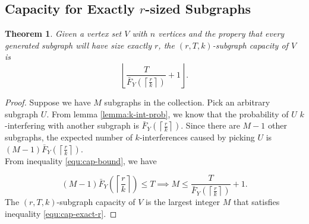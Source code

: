 \documentclass[10pt]{extarticle}
\newtheorem{theorem}{Theorem}
\theoremstyle{definition}
\begin{document}
\subsection{Capacity for Exactly $r$-sized Subgraphs}

\begin{theorem}
    Given a vertex set $V$ with $n$ vertices and the propery that every generated subgraph will have size exactly $r$, the $(r,T,k)$-subgraph capacity of $V$ is 
    \begin{equation*}
        \left\lfloor \frac{T}{\bar{F}_Y\left(\left\lceil \frac{r}{k} \right\rceil\right)} + 1 \right\rfloor.
    \end{equation*}
\end{theorem}

\begin{proof}
    Suppose we have $M$ subgraphs in the collection. Pick an arbitrary subgraph $U$. From lemma \ref{lemma:k-int-prob}, we know that the probability of $U$ $k$-interfering with another subgraph is $\bar{F}_Y\left(\left\lceil \frac{r}{k} \right\rceil\right)$. Since there are $M-1$ other subgraphs, the expected number of $k$-interferences caused by picking $U$ is $(M-1) \bar{F}_Y\left(\left\lceil \frac{r}{k} \right\rceil\right)$. \\

\noindent From inequality \ref{equ:cap-bound}, we have 

    \begin{equation}
    \label{equ:cap-exact-r}
        (M-1) \bar{F}_Y\left(\left\lceil \frac{r}{k} \right\rceil\right) \le T \implies M \le \frac{T}{\bar{F}_Y\left(\left\lceil \frac{r}{k} \right\rceil\right)} + 1.
    \end{equation}
    The $(r,T,k)$-subgraph capacity of $V$ is the largest integer $M$ that satisfies inequality \ref{equ:cap-exact-r}.
\end{proof}
\end{document}
